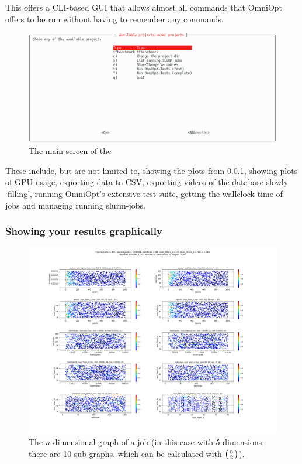 \documentclass[]{scrartcl}
\begin{document}
This offers a CLI-based GUI that allows almost all commands that OmniOpt offers to be run without having to remember
any commands.

\begin{figure}[h!]
        \centering
        \includegraphics[width=0.7\paperwidth]{dostuff.png}
	\caption{The main screen of the }
        \label{plotscreen}
\end{figure}

These include, but are not limited to, showing the plots from \ref{plot}, showing plots of GPU-usage, exporting
data to CSV, exporting videos of the database slowly `filling', running OmniOpt's extensive test-suite, getting
the wallclock-time of jobs and managing running slurm-jobs.

\subsubsection{Showing your results graphically}
\label{plot}

\begin{figure}[h!]
        \centering
        \includegraphics[width=0.7\paperwidth]{graph.png}
        \caption{The $n$-dimensional graph of a job (in this case with 5 dimensions, there are 10 sub-graphs, which can be calculated with $\left(n\atop 2\right)$).}
        \label{plotscreen}
\end{figure}
\end{document}
